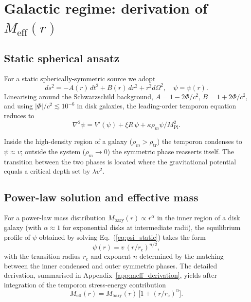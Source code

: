 \documentclass[%
    aps,
    prd,
    reprint,
    superscriptaddress,
    nofootinbib,
    floatfix,
    amsmath,amssymb,
]{revtex4-2}
\newcommand{\Meff}{M_{\mathrm{eff}}}
\newcommand{\Mbary}{M_{\mathrm{bary}}}
\newcommand{\rc}{r_{\mathrm{c}}}
\newcommand{\MPl}{M_{\mathrm{Pl}}}
\begin{document}
\section{Galactic regime: derivation of $\Meff(r)$}
\label{sec:galactic}

\subsection{Static spherical ansatz}

For a static spherically-symmetric source we adopt
\begin{equation}
ds^{2} = -A(r)\,dt^{2} + B(r)\,dr^{2} + r^{2}d\Omega^{2},
\quad \psi = \psi(r).
\end{equation}
Linearising around the Schwarzschild background, $A=1-2\Phi/c^{2}$,
$B=1+2\Phi/c^{2}$, and using $|\Phi|/c^{2} \lesssim 10^{-6}$ in
disk galaxies, the leading-order temporon equation reduces to
\begin{equation}
\label{eq:psi_static}
\nabla^{2}\psi = V'(\psi) + \xi R\,\psi + \kappa\rho_{m}\psi/\MPl^{2}.
\end{equation}

Inside the high-density region of a galaxy ($\rho_{m}>\rho_{\mathrm{tr}}$)
the temporon condenses to $\psi\approx v$; outside the system
($\rho_{m}\!\to\!0$) the symmetric phase reasserts itself.
The transition between the two phases is located where the
gravitational potential equals a critical depth set by $\lambda v^{2}$.

\subsection{Power-law solution and effective mass}

For a power-law mass distribution $\Mbary(r) \propto r^{\alpha}$
in the inner region of a disk galaxy (with $\alpha \approx 1$ for
exponential disks at intermediate radii), the equilibrium profile
of $\psi$ obtained by solving Eq.~(\ref{eq:psi_static}) takes the form
\begin{equation}
\label{eq:psi_profile}
\psi(r) = v\,(r/\rc)^{n/2},
\end{equation}
with the transition radius $\rc$ and exponent $n$ determined by
the matching between the inner condensed and outer symmetric
phases. The detailed derivation, summarised in Appendix~\ref{app:meff_derivation},
yields after integration of the temporon stress-energy contribution
\begin{equation}
\label{eq:Meff}
\Meff(r) = \Mbary(r)\,\bigl[1 + (r/\rc)^{n}\bigr].
\end{equation}
\end{document}
